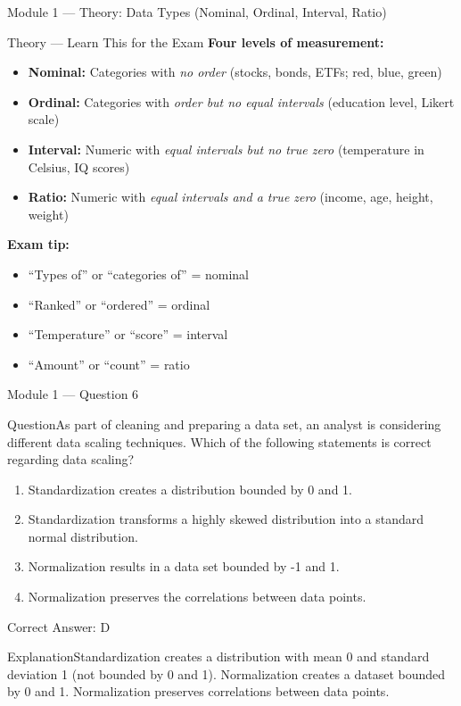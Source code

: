 \documentclass[aspectratio=169,10pt]{beamer}
\newcommand{\question}[1]{\begin{block}{Question}#1\end{block}}
\newcommand{\options}[4]{%
	\begin{enumerate}[label=\Alph*.,leftmargin=*]
		\item #1
		\item #2
		\item #3
		\item #4
	\end{enumerate}
}
\newcommand{\answerbox}[1]{\begin{exampleblock}{Correct Answer: #1}\end{exampleblock}}
\newcommand{\explain}[1]{\begin{block}{Explanation}#1\end{block}}
\newcommand{\theory}[1]{%
	\begin{block}{Theory --- Learn This for the Exam}
		\small #1
	\end{block}
}
\begin{document}
	\begin{frame}{Module 1 --- Theory: Data Types (Nominal, Ordinal, Interval, Ratio)}
		\theory{
			\textbf{Four levels of measurement:}
			\begin{itemize}
				\item \textbf{Nominal:} Categories with \emph{no order} (stocks, bonds, ETFs; red, blue, green)
				\item \textbf{Ordinal:} Categories with \emph{order but no equal intervals} (education level, Likert scale)
				\item \textbf{Interval:} Numeric with \emph{equal intervals but no true zero} (temperature in Celsius, IQ scores)
				\item \textbf{Ratio:} Numeric with \emph{equal intervals and a true zero} (income, age, height, weight)
			\end{itemize}
			\textbf{Exam tip:}
			\begin{itemize}
				\item ``Types of'' or ``categories of'' = nominal
				\item ``Ranked'' or ``ordered'' = ordinal
				\item ``Temperature'' or ``score'' = interval
				\item ``Amount'' or ``count'' = ratio
			\end{itemize}
		}
	\end{frame}
	
	\begin{frame}{Module 1 --- Question 6}
		\question{As part of cleaning and preparing a data set, an analyst is considering different data scaling techniques. Which of the following statements is correct regarding data scaling?}
		\options{Standardization creates a distribution bounded by 0 and 1.}{Standardization transforms a highly skewed distribution into a standard normal distribution.}{Normalization results in a data set bounded by -1 and 1.}{Normalization preserves the correlations between data points.}
		\answerbox{D}
		\explain{Standardization creates a distribution with mean 0 and standard deviation 1 (not bounded by 0 and 1). Normalization creates a dataset bounded by 0 and 1. Normalization preserves correlations between data points.}
	\end{frame}
	
\end{document}
